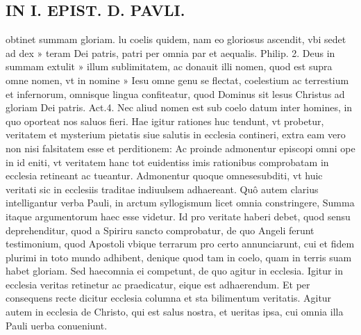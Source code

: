 \documentclass{article}
\begin{document}
\begin{pages}
\section*{IN I. EPIST. D. PAVLI. }
\marginpar{[ p.90 ]}\pstart obtinet summam gloriam. lu coelis quidem, nam eo gloriosus ascendit, vbi sedet ad dex » teram Dei patris, patri per omnia par et aequalis. Philip. 2. Deus in summam extulit » illum sublimitatem, ac donauit illi nomen, quod est supra omne nomen, vt in nomine » Iesu omne genu se flectat, coelestium ac terrestium et infernorum, omnisque lingua confiteatur, quod Dominus sit lesus Christus ad gloriam Dei patris. Act.4. Nec aliud nomen est sub coelo datum inter homines, in quo oporteat nos saluos fieri. Hae igitur rationes huc tendunt, vt probetur, veritatem et mysterium pietatis siue salutis in ecclesia contineri, extra eam vero non nisi falsitatem esse et perditionem: Ac proinde admonentur episcopi omni ope in id eniti, vt veritatem hanc tot euidentiss imis rationibus comprobatam in ecclesia retineant ac tueantur. Admonentur quoque omnesesubditi, vt huic veritati sic in ecclesiis traditae indiuulsem adhaereant. Quô autem clarius intelligantur verba Pauli, in arctum syllogismum licet omnia constringere, Summa itaque  argumentorum haec esse videtur. Id pro veritate haberi debet, quod sensu deprehenditur, quod a Spiriru sancto comprobatur, de quo Angeli ferunt testimonium, quod Apostoli vbique terrarum pro certo annunciarunt, cui et fidem plurimi in toto mundo adhibent, denique quod tam in coelo, quam in terris suam habet gloriam. Sed haecomnia ei competunt, de quo agitur in ecclesia. Igitur in ecclesia veritas retinetur ac praedicatur, eique est adhaerendum. Et per consequens recte dicitur ecclesia columna et sta bilimentum veritatis. Agitur autem in ecclesia de Christo, qui est salus nostra, et ueritas ipsa, cui omnia illa Pauli uerba conueniunt.  \pend
{}
{}

\end{pages}
\end{document}
